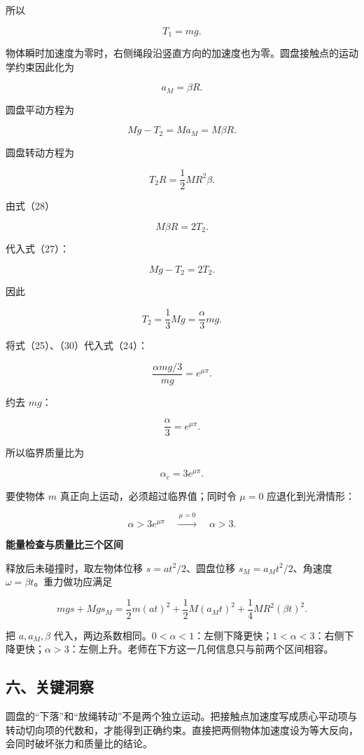 \documentclass[12pt,a4paper,UTF8]{ctexart}
\begin{document}
所以

\[
\boxed{T_1=mg}.
\tag{25}
\]

物体瞬时加速度为零时，右侧绳段沿竖直方向的加速度也为零。圆盘接触点的运动学约束因此化为

\[
a_M=\beta R.
\tag{26}
\]

圆盘平动方程为

\[
Mg-T_2=Ma_M=M\beta R.
\tag{27}
\]

圆盘转动方程为

\[
T_2R=\frac12MR^2\beta.
\tag{28}
\]

由式（28）

\[
M\beta R=2T_2.
\tag{29}
\]

代入式（27）：

\[
Mg-T_2=2T_2.
\]

因此

\[
\boxed{T_2=\frac13Mg=\frac\alpha3mg}.
\tag{30}
\]

将式（25）、（30）代入式（24）：

\[
\frac{\alpha mg/3}{mg}=e^{\mu\pi}.
\]

约去 \(mg\)：

\[
\frac\alpha3=e^{\mu\pi}.
\]

所以临界质量比为

\[
\alpha_c=3e^{\mu\pi}.
\tag{31}
\]

要使物体 \(m\) 真正向上运动，必须超过临界值；同时令 \(\mu=0\)
应退化到光滑情形：

\[
\boxed{\alpha>3e^{\mu\pi}}
\quad\xrightarrow{\,\mu=0\,}\quad
\boxed{\alpha>3}.
\tag{32}
\]

\textbf{能量检查与质量比三个区间}

释放后未碰撞时，取左物体位移 \(s=at^2/2\)、圆盘位移
\(s_M=a_Mt^2/2\)、角速度 \(\omega=\beta t\)。重力做功应满足

\[mgs+Mgs_M=\frac12m(at)^2+\frac12M(a_Mt)^2+\frac14MR^2(\beta t)^2.\]

把 \(a,a_M,\beta\)
代入，两边系数相同。\(0<\alpha<1\)：左侧下降更快；\(1<\alpha<3\)：右侧下降更快；\(\alpha>3\)：左侧上升。老师在下方这一几何信息只与前两个区间相容。

\subsection{六、关键洞察}\label{ux516dux5173ux952eux6d1eux5bdf-3}

圆盘的``下落''和``放绳转动''不是两个独立运动。把接触点加速度写成质心平动项与转动切向项的代数和，才能得到正确约束。直接把两侧物体加速度设为等大反向，会同时破坏张力和质量比的结论。
\end{document}
